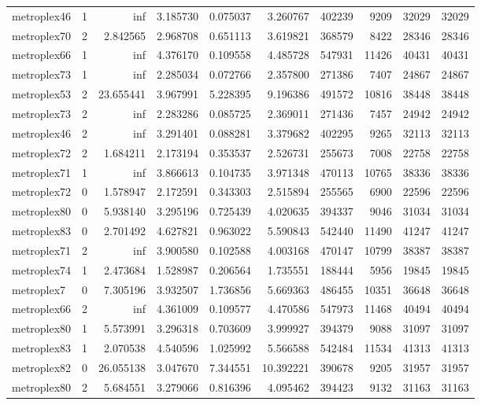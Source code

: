 \documentclass[../../../thesis.tex]{subfiles}
\begin{document}
\begin{longtable}{|l|r|r|r|r|r|r|r|r|r|}
metroplex46 & 1 & inf & 3.185730 & 0.075037 & 3.260767 & 402239 & 9209 & 32029 & 32029 \\
metroplex70 & 2 & 2.842565 & 2.968708 & 0.651113 & 3.619821 & 368579 & 8422 & 28346 & 28346 \\
metroplex66 & 1 & inf & 4.376170 & 0.109558 & 4.485728 & 547931 & 11426 & 40431 & 40431 \\
metroplex73 & 1 & inf & 2.285034 & 0.072766 & 2.357800 & 271386 & 7407 & 24867 & 24867 \\
metroplex53 & 2 & 23.655441 & 3.967991 & 5.228395 & 9.196386 & 491572 & 10816 & 38448 & 38448 \\
metroplex73 & 2 & inf & 2.283286 & 0.085725 & 2.369011 & 271436 & 7457 & 24942 & 24942 \\
metroplex46 & 2 & inf & 3.291401 & 0.088281 & 3.379682 & 402295 & 9265 & 32113 & 32113 \\
metroplex72 & 2 & 1.684211 & 2.173194 & 0.353537 & 2.526731 & 255673 & 7008 & 22758 & 22758 \\
metroplex71 & 1 & inf & 3.866613 & 0.104735 & 3.971348 & 470113 & 10765 & 38336 & 38336 \\
metroplex72 & 0 & 1.578947 & 2.172591 & 0.343303 & 2.515894 & 255565 & 6900 & 22596 & 22596 \\
metroplex80 & 0 & 5.938140 & 3.295196 & 0.725439 & 4.020635 & 394337 & 9046 & 31034 & 31034 \\
metroplex83 & 0 & 2.701492 & 4.627821 & 0.963022 & 5.590843 & 542440 & 11490 & 41247 & 41247 \\
metroplex71 & 2 & inf & 3.900580 & 0.102588 & 4.003168 & 470147 & 10799 & 38387 & 38387 \\
metroplex74 & 1 & 2.473684 & 1.528987 & 0.206564 & 1.735551 & 188444 & 5956 & 19845 & 19845 \\
metroplex7 & 0 & 7.305196 & 3.932507 & 1.736856 & 5.669363 & 486455 & 10351 & 36648 & 36648 \\
metroplex66 & 2 & inf & 4.361009 & 0.109577 & 4.470586 & 547973 & 11468 & 40494 & 40494 \\
metroplex80 & 1 & 5.573991 & 3.296318 & 0.703609 & 3.999927 & 394379 & 9088 & 31097 & 31097 \\
metroplex83 & 1 & 2.070538 & 4.540596 & 1.025992 & 5.566588 & 542484 & 11534 & 41313 & 41313 \\
metroplex82 & 0 & 26.055138 & 3.047670 & 7.344551 & 10.392221 & 390678 & 9205 & 31957 & 31957 \\
metroplex80 & 2 & 5.684551 & 3.279066 & 0.816396 & 4.095462 & 394423 & 9132 & 31163 & 31163 \\

\end{longtable}
\end{document}
